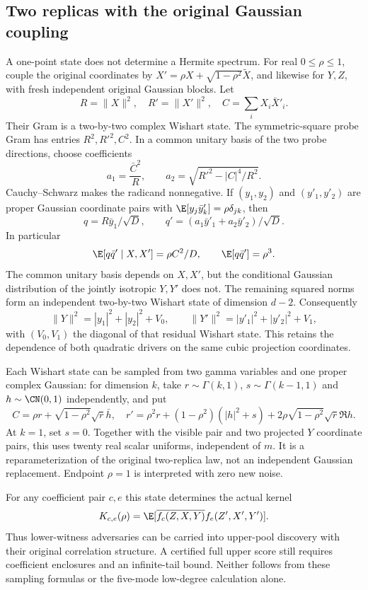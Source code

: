 \subsection{Two replicas with the original Gaussian coupling}
A one-point state does not determine a Hermite spectrum. For real
$0\le\rho\le1$, couple the original coordinates by
$X'=\rho X+\sqrt{1-\rho^2}\widetilde X$, and likewise for $Y,Z$, with fresh
independent original Gaussian blocks. Let
\[
 R=\|X\|^2,\quad R'=\|X'\|^2,\quad C=\sum_iX_i\bar X'_i.
\]
Their Gram is a two-by-two complex Wishart state. The symmetric-square probe
Gram has entries $R^2,R'^2,C^2$. In a common unitary basis of the two probe
directions, choose coefficients
\[
 a_1=\frac{\bar C^2}{R},\qquad
 a_2=\sqrt{R'^2-|C|^4/R^2}.
\]
Cauchy--Schwarz makes the radicand nonnegative. If
$(y_1,y_2)$ and $(y'_1,y'_2)$ are proper Gaussian coordinate pairs with
$\E[y_j\bar y'_k]=\rho\delta_{jk}$, then
\[
 q=R\bar y_1/\sqrt D,\qquad
 q'=(a_1\bar y'_1+a_2\bar y'_2)/\sqrt D.
\]
In particular
\[
 \E[q\bar q'\mid X,X']=\rho C^2/D,\qquad
 \E[q\bar q']=\rho^3.
\]
The common unitary basis depends on $X,X'$, but the conditional Gaussian
distribution of the jointly isotropic $Y,Y'$ does not. The remaining squared
norms form an independent two-by-two Wishart state of dimension $d-2$.
Consequently
\[
 \|Y\|^2=|y_1|^2+|y_2|^2+V_0,\qquad
 \|Y'\|^2=|y'_1|^2+|y'_2|^2+V_1,
\]
with $(V_0,V_1)$ the diagonal of that residual Wishart state. This retains the
dependence of both quadratic drivers on the same cubic projection coordinates.

Each Wishart state can be sampled from two gamma variables and one proper
complex Gaussian: for dimension $k$, take $r\sim\Gamma(k,1)$,
$s\sim\Gamma(k-1,1)$ and $h\sim\CN(0,1)$ independently, and put
\[
 C=\rho r+\sqrt{1-\rho^2}\sqrt r\bar h,
\quad
 r'=\rho^2r+(1-\rho^2)(|h|^2+s)
       +2\rho\sqrt{1-\rho^2}\sqrt r\Re h.
\]
At $k=1$, set $s=0$. Together with the visible pair and two projected $Y$
coordinate pairs, this uses twenty real scalar uniforms, independent of $m$.
It is a reparameterization of the original two-replica law, not an independent
Gaussian replacement. Endpoint $\rho=1$ is interpreted with zero new noise.

For any coefficient pair $c,e$ this state determines the actual kernel
\[
 K_{c,e}(\rho)=\E[\overline{f_c(Z,X,Y)}f_e(Z',X',Y')].
\]
Thus lower-witness adversaries can be carried into upper-pool discovery with
their original correlation structure. A certified full upper score still
requires coefficient enclosures and an infinite-tail bound. Neither follows
from these sampling formulas or the five-mode low-degree calculation alone.


